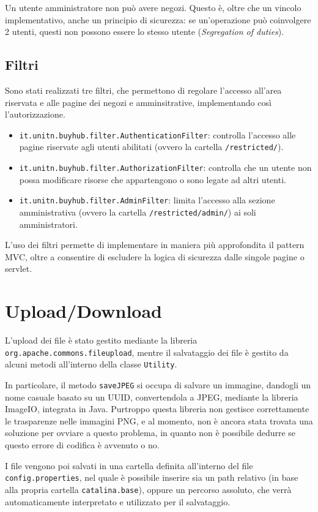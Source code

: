 Un utente amministratore non può avere negozi. Questo è, oltre che un vincolo implementativo, anche un principio di sicurezza: se un'operazione può coinvolgere 2 utenti, questi non possono essere lo stesso utente (\textit{Segregation of duties}).

\section{Filtri}
Sono stati realizzati tre filtri, che permettono di regolare l'accesso all'area riservata e alle pagine dei negozi e amminsitrative, implementando così l'autorizzazione.
\begin{itemize}
  \item \texttt{it.unitn.buyhub.filter.AuthenticationFilter}: controlla l'accesso alle pagine riservate agli utenti abilitati (ovvero la cartella \texttt{/restricted/}).
  \item \texttt{it.unitn.buyhub.filter.AuthorizationFilter}: controlla che un utente non possa modificare risorse che appartengono o sono legate ad altri utenti.
  \item \texttt{it.unitn.buyhub.filter.AdminFilter}: limita l'accesso alla sezione amministrativa  (ovvero la cartella \texttt{/restricted/admin/}) ai soli amministratori.
\end{itemize}

L'uso dei filtri permette di implementare in maniera più approfondita il pattern MVC, oltre a consentire di escludere la logica di sicurezza dalle singole pagine o servlet.

\chapter{Upload/Download}

L'upload dei file è stato gestito mediante la libreria \texttt{org.apache.commons.fileupload}, mentre il salvataggio dei file è gestito da alcuni metodi all'interno della classe \texttt{Utility}.

In particolare, il metodo \texttt{saveJPEG} si occupa di salvare un immagine, dandogli un nome casuale basato su un UUID, convertendola a JPEG, mediante la libreria ImageIO, integrata in Java.
Purtroppo questa libreria non gestisce correttamente le trasparenze nelle immagini PNG, e al momento, non è ancora stata trovata una soluzione per ovviare a questo problema, in quanto non è possibile dedurre se questo errore di codifica è avvenuto o no.

I file vengono poi salvati in una cartella definita all'interno del file \texttt{config.properties}, nel quale è possibile inserire sia un path relativo (in base alla propria cartella \texttt{catalina.base}), oppure un percorso assoluto, che verrà automaticamente interpretato e utilizzato per il salvataggio.

